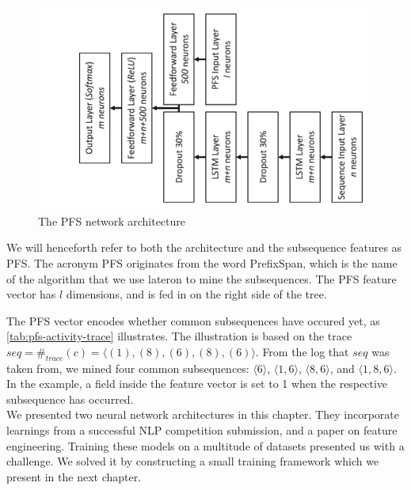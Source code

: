 \begin{figure}
    \centering
    \includegraphics[width=.8\textwidth,angle=-90,origin=c]{gfx/pfs-network-architecture.pdf}
    \caption{The PFS network architecture}
    \label{fig:pfs-architecture}
\end{figure}

We will henceforth refer to both the architecture and the subsequence features as PFS.
The acronym PFS originates from the word PrefixSpan, which is the name of the algorithm that we use lateron to mine the subsequences.
The PFS feature vector has $l$ dimensions, and is fed in on the right side of the tree.

The PFS vector encodes whether common subsequences have occured yet, as \autoref{tab:pfs-activity-trace} illustrates.
The illustration is based on the trace $seq=\#_{trace}(c)=\langle (1), (8), (6), (8), (6)\rangle$.
From the log that $seq$ was taken from, we mined four common subsequences: $\langle 6\rangle$, $\langle 1,6\rangle$, $\langle 8,6\rangle$, and $\langle1,8,6\rangle$.
In the example, a field inside the feature vector is set to 1 when the respective subsequence has occurred.\\

We presented two neural network architectures in this chapter. They incorporate
learnings from a successful NLP competition submission, and a paper on feature engineering.
Training these models on a multitude of datasets presented us with a challenge.
We solved it by constructing a small training framework which we present in the next chapter.

